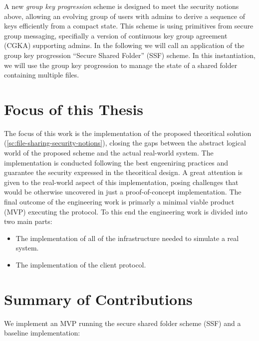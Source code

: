 A new \textit{group key progression} scheme is designed to meet the security notions above,
allowing an evolving group of users with admins to derive a sequence of keys efficiently from a compact state. 
This scheme is using primitives from secure group messaging, 
specifially a version of continuous key group agreement (CGKA) supporting admins.\cite{USENIX:BalColVau23}
In the following we will call an application of the group key progression ``Secure Shared Folder'' (SSF) scheme.
In this instantiation, we will use the group key progression to manage the state of a shared folder containing multiple files. 

\section{Focus of this Thesis}\label{sc:focus-of-this-thesis}

The focus of this work is the implementation of the proposed theoritical solution (\cref{sc:file-sharing-security-notions}),
closing the gaps between the abstract logical world of the proposed scheme
and the actual real-world system.
The implementation is conducted following the best engeeniring practices 
and guarantee the security expressed in the theoritical design.
A great attention is given to the real-world aspect of this implementation,
posing challenges that would be otherwise uncovered in just a proof-of-concept implementation.
The final outcome of the engineering work is primarly a minimal viable product (MVP) executing the protocol.
To this end the engineering work is divided into two main parts:
\begin{itemize}
    \item The implementation of all of the infrastructure needed to simulate a real system.
    \item The implementation of the client protocol.
\end{itemize}

\section{Summary of Contributions}

We implement an MVP running the secure shared folder scheme (SSF) and a baseline implementation:

